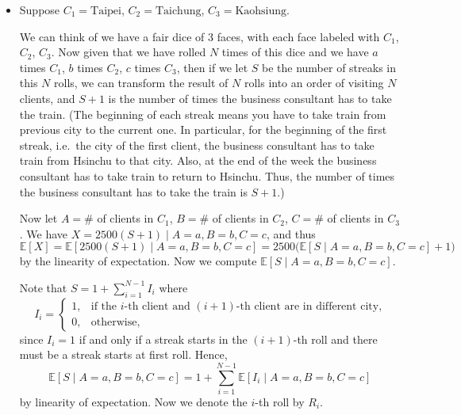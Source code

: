 \documentclass[a4paper,12pt]{article}
\begin{document}
\begin{itemize}
    \item[(a)] Suppose $C_1 = \text{Taipei}$, $C_2 = \text{Taichung}$, $C_3 = \text{Kaohsiung}$.

    We can think of we have a fair dice of 3 faces, with each face labeled with $C_1$, $C_2$, $C_3$. Now given that we have rolled $N$ times of this dice and we have $a$ times $C_1$, $b$ times $C_2$, $c$ times $C_3$, then if we let $S$ be the number of streaks in this $N$ rolls, we can transform the result of $N$ rolls into an order of visiting $N$ clients, and $S+1$ is the number of times the business consultant has to take the train. (The beginning of each streak means you have to take train from previous city to the current one. In particular, for the beginning of the first streak, i.e.\ the city of the first client, the business consultant has to take train from Hsinchu to that city. Also, at the end of the week the business consultant has to take train to return to Hsinchu. Thus, the number of times the business consultant has to take the train is $S+1$.)

    Now let $A = \#$ of clients in $C_1$, $B = \#$ of clients in $C_2$, $C = \#$ of clients in $C_3$. We have $X = 2500(S+1) \mid A=a, B=b, C=c$, and thus
    \[
        \mathbb{E}[X] = \mathbb{E}[2500(S+1) \mid A=a, B=b, C=c] = 2500\bigl(\mathbb{E}[S \mid A=a, B=b, C=c] + 1\bigr)
    \]
    by the linearity of expectation. Now we compute $\mathbb{E}[S \mid A=a, B=b, C=c]$.

    Note that $S = 1 + \displaystyle\sum_{i=1}^{N-1} I_i$ where
    \[
        I_i = \begin{cases} 1, & \text{if the $i$-th client and $(i+1)$-th client are in different city,} \\ 0, & \text{otherwise,} \end{cases}
    \]
    since $I_i = 1$ if and only if a streak starts in the $(i+1)$-th roll and there must be a streak starts at first roll. Hence,
    \[
        \mathbb{E}[S \mid A=a, B=b, C=c] = 1 + \sum_{i=1}^{N-1} \mathbb{E}[I_i \mid A=a, B=b, C=c]
    \]
    by linearity of expectation. Now we denote the $i$-th roll by $R_i$.


\end{itemize}
\end{document}
